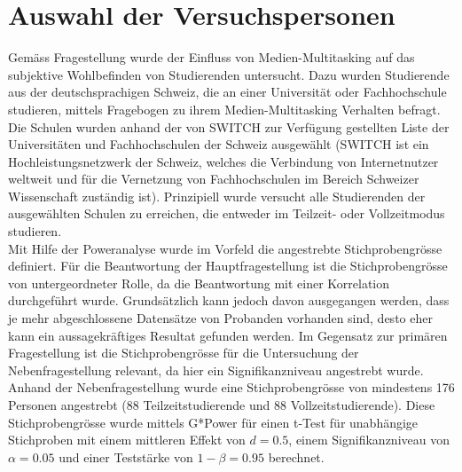 \section{Auswahl der Versuchspersonen}\label{section.auswahlVersuchsp}
Gemäss Fragestellung wurde der Einfluss von Medien-Multitasking auf das subjektive Wohlbefinden von Studierenden untersucht. Dazu wurden Studierende aus der deutschsprachigen Schweiz, die an einer Universität oder Fachhochschule studieren, mittels Fragebogen zu ihrem Medien-Multitasking Verhalten befragt. Die Schulen wurden anhand der von SWITCH \cite{Switch2014} zur Verfügung gestellten Liste der Universitäten und Fachhochschulen der Schweiz ausgewählt (SWITCH ist ein Hochleistungsnetzwerk der Schweiz, welches die Verbindung von Internetnutzer weltweit und für die Vernetzung von Fachhochschulen im Bereich Schweizer Wissenschaft zuständig ist). Prinzipiell wurde versucht alle Studierenden der ausgewählten Schulen zu erreichen, die entweder im Teilzeit- oder Vollzeitmodus studieren. \\
Mit Hilfe der Poweranalyse \cite{Faul2009} wurde im Vorfeld die angestrebte  Stichprobengrösse definiert. Für die Beantwortung der Hauptfragestellung ist die Stichprobengrösse von untergeordneter Rolle, da die Beantwortung mit einer Korrelation durchgeführt wurde. Grundsätzlich kann jedoch davon ausgegangen werden, dass je mehr abgeschlossene Datensätze von Probanden vorhanden sind, desto eher kann ein aussagekräftiges Resultat gefunden werden. Im Gegensatz zur primären Fragestellung ist die Stichprobengrösse für die Untersuchung der Nebenfragestellung relevant, da hier ein Signifikanzniveau angestrebt wurde. \\
Anhand der Nebenfragestellung wurde eine Stichprobengrösse von mindestens 176 Personen angestrebt (88 Teilzeitstudierende und 88 Vollzeitstudierende). Diese Stichprobengrösse wurde mittels G*Power \cite{Faul2009} für einen t-Test für unabhängige Stichproben mit einem mittleren Effekt von $d = 0.5$, einem Signifikanzniveau von $\alpha=0.05$ und einer Teststärke von $1-\beta=0.95$ berechnet.

